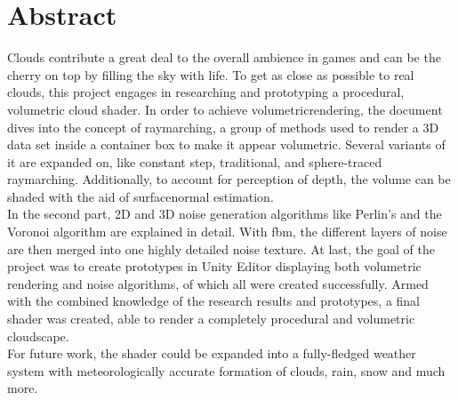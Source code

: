 \section*{Abstract}
Clouds contribute a great deal to the overall ambience in games and can be the cherry on top by filling the sky with life.
To get as close as possible to real clouds, this project engages in researching and prototyping a \gls{procedural}, volumetric cloud shader.
\emptyline
In order to achieve \gls{volumetricrendering}, the document dives into the concept of \gls{raymarching}, a group of methods used to render a 3D data set inside a container box to make it appear volumetric.
Several variants of it are expanded on, like constant step, traditional, and sphere-traced \gls{raymarching}. Additionally, to account for perception of depth, the volume can be shaded with the aid of \gls{surfacenormal} estimation.
\\
In the second part, 2D and 3D \gls{noise} generation algorithms like Perlin's and the Voronoi algorithm are explained in detail. With \gls{fbm}, the different layers of noise are then merged into one highly detailed noise texture.
\emptyline
At last, the goal of the project was to create prototypes in Unity Editor displaying both volumetric rendering and noise algorithms, of which all were created successfully.
Armed with the combined knowledge of the research results and prototypes, a final shader was created, able to render a completely \gls{procedural} and volumetric cloudscape.
\\
For future work, the shader could be expanded into a fully-fledged weather system with meteorologically accurate formation of clouds, rain, snow and much more.